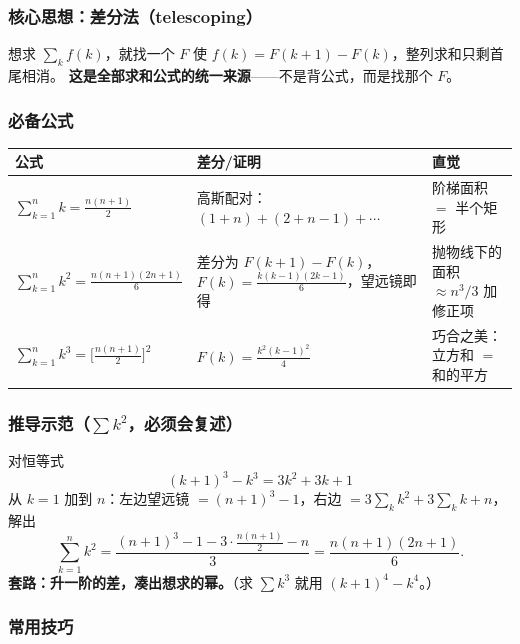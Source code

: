 \subsubsection{核心思想：差分法（telescoping）}

想求 $\sum_k f(k)$，就找一个 $F$ 使 $f(k) = F(k+1) - F(k)$，整列求和只剩首尾相消。
\textbf{这是全部求和公式的统一来源}——不是背公式，而是找那个 $F$。

\subsubsection{必备公式}

\begin{center}
\begin{tabular}{L{3.2cm}L{6.2cm}L{5.2cm}}
\toprule
\textbf{公式} & \textbf{差分/证明} & \textbf{直觉} \\
\midrule
$\displaystyle\sum_{k=1}^n k=\frac{n(n+1)}{2}$ & 高斯配对：$(1+n)+(2+n-1)+\cdots$ & 阶梯面积 $=$ 半个矩形 \\
$\displaystyle\sum_{k=1}^n k^2=\frac{n(n+1)(2n+1)}{6}$ &
差分为 $F(k+1)-F(k)$，$F(k)=\frac{k(k-1)(2k-1)}{6}$，望远镜即得 &
抛物线下的面积 $\approx n^3/3$ 加修正项 \\
$\displaystyle\sum_{k=1}^n k^3=\Big[\frac{n(n+1)}{2}\Big]^2$ &
$F(k)=\frac{k^2(k-1)^2}{4}$ & 巧合之美：立方和 $=$ 和的平方 \\
\bottomrule
\end{tabular}
\end{center}

\subsubsection{推导示范（$\sum k^2$，必须会复述）}

对恒等式
\[
(k+1)^3-k^3 = 3k^2+3k+1
\]
从 $k=1$ 加到 $n$：左边望远镜 $=(n+1)^3-1$，右边 $=3\sum_k k^2+3\sum_k k+n$，解出
\[
\sum_{k=1}^n k^2=\frac{(n+1)^3-1-3\cdot\frac{n(n+1)}{2}-n}{3}=\frac{n(n+1)(2n+1)}{6}.
\]
\textbf{套路：升一阶的差，凑出想求的幂。}（求 $\sum k^3$ 就用 $(k+1)^4-k^4$。）

\subsubsection{常用技巧}

